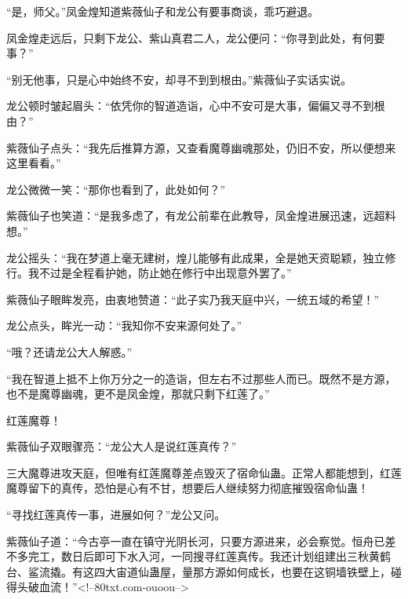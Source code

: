 \begin{this_body}
“是，师父。”凤金煌知道紫薇仙子和龙公有要事商谈，乖巧避退。

凤金煌走远后，只剩下龙公、紫山真君二人，龙公便问：“你寻到此处，有何要事？”

“别无他事，只是心中始终不安，却寻不到到根由。”紫薇仙子实话实说。

龙公顿时皱起眉头：“依凭你的智道造诣，心中不安可是大事，偏偏又寻不到根由？”

紫薇仙子点头：“我先后推算方源，又查看魔尊幽魂那处，仍旧不安，所以便想来这里看看。”

龙公微微一笑：“那你也看到了，此处如何？”

紫薇仙子也笑道：“是我多虑了，有龙公前辈在此教导，凤金煌进展迅速，远超料想。”

龙公摇头：“我在梦道上毫无建树，煌儿能够有此成果，全是她天资聪颖，独立修行。我不过是全程看护她，防止她在修行中出现意外罢了。”

紫薇仙子眼眸发亮，由衷地赞道：“此子实乃我天庭中兴，一统五域的希望！”

龙公点头，眸光一动：“我知你不安来源何处了。”

“哦？还请龙公大人解惑。”

“我在智道上抵不上你万分之一的造诣，但左右不过那些人而已。既然不是方源，也不是魔尊幽魂，更不是凤金煌，那就只剩下红莲了。”

红莲魔尊！

紫薇仙子双眼骤亮：“龙公大人是说红莲真传？”

三大魔尊进攻天庭，但唯有红莲魔尊差点毁灭了宿命仙蛊。正常人都能想到，红莲魔尊留下的真传，恐怕是心有不甘，想要后人继续努力彻底摧毁宿命仙蛊！

“寻找红莲真传一事，进展如何？”龙公又问。

紫薇仙子道：“今古亭一直在镇守光阴长河，只要方源进来，必会察觉。恒舟已差不多完工，数日后即可下水入河，一同搜寻红莲真传。我还计划组建出三秋黄鹤台、鲨流撬。有这四大宙道仙蛊屋，量那方源如何成长，也要在这铜墙铁壁上，碰得头破血流！”<!--80txt.com-ouoou-->

\end{this_body}

